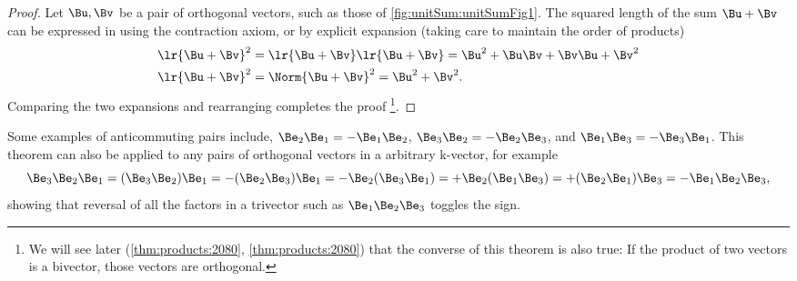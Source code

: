 %
%

\begin{proof}
Let \( \Bu, \Bv \) be a pair of orthogonal vectors, such as those of
\cref{fig:unitSum:unitSumFig1}.  The squared length of the sum \( \Bu + \Bv \) can be expressed in using
the contraction axiom, or by explicit expansion (taking care to maintain the order of products)
\begin{align*}
\lr{ \Bu + \Bv }^2 &= \lr{ \Bu + \Bv }\lr{ \Bu + \Bv } = \Bu^2 + \Bu \Bv + \Bv \Bu + \Bv^2 \\
\lr{ \Bu + \Bv }^2 &= \Norm{ \Bu + \Bv }^2 = \Bu^2 + \Bv^2.
\end{align*}
Comparing the two expansions and rearranging completes the proof%
\footnote{We will see later (\cref{thm:products:2080}, \cref{thm:products:2080}) that the converse of this theorem is also true: If the product of two vectors is a bivector, those vectors are orthogonal.}.
\end{proof}

Some examples of anticommuting pairs include,
\( \Be_2 \Be_1 = -\Be_1 \Be_2 \),
\( \Be_3 \Be_2 = -\Be_2 \Be_3 \), and
\( \Be_1 \Be_3 = -\Be_3 \Be_1 \).  This theorem can also be applied to any pairs of orthogonal vectors in a arbitrary k-vector, for example
\begin{dmath}\label{eqn:normalVectors:300}
\Be_3 \Be_2 \Be_1
= (\Be_3 \Be_2) \Be_1
= -(\Be_2 \Be_3) \Be_1
= -\Be_2 (\Be_3 \Be_1)
= +\Be_2 (\Be_1 \Be_3)
= +(\Be_2 \Be_1) \Be_3
= -\Be_1 \Be_2 \Be_3,
\end{dmath}
showing that reversal of all the factors in a trivector such as \( \Be_1 \Be_2 \Be_3 \) toggles the sign.

